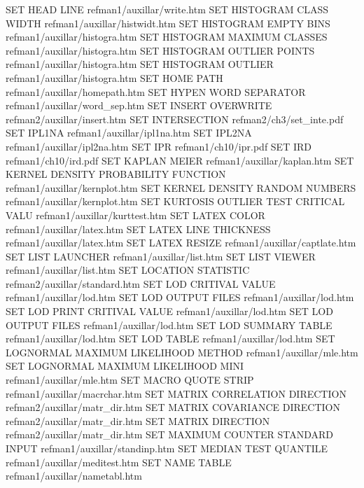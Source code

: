 SET HEAD LINE                           refman1/auxillar/write.htm
SET HISTOGRAM CLASS WIDTH               refman1/auxillar/histwidt.htm
SET HISTOGRAM EMPTY BINS                refman1/auxillar/histogra.htm
SET HISTOGRAM MAXIMUM CLASSES           refman1/auxillar/histogra.htm
SET HISTOGRAM OUTLIER POINTS            refman1/auxillar/histogra.htm
SET HISTOGRAM OUTLIER                   refman1/auxillar/histogra.htm
SET HOME PATH                           refman1/auxillar/homepath.htm
SET HYPEN WORD SEPARATOR                refman1/auxillar/word_sep.htm
SET INSERT OVERWRITE                    refman2/auxillar/insert.htm
SET INTERSECTION                        refman2/ch3/set_inte.pdf
SET IPL1NA                              refman1/auxillar/ipl1na.htm
SET IPL2NA                              refman1/auxillar/ipl2na.htm
SET IPR                                 refman1/ch10/ipr.pdf
SET IRD                                 refman1/ch10/ird.pdf
SET KAPLAN MEIER                        refman1/auxillar/kaplan.htm
SET KERNEL DENSITY PROBABILITY FUNCTION refman1/auxillar/kernplot.htm
SET KERNEL DENSITY RANDOM NUMBERS       refman1/auxillar/kernplot.htm
SET KURTOSIS OUTLIER TEST CRITICAL VALU refman1/auxillar/kurttest.htm
SET LATEX COLOR                         refman1/auxillar/latex.htm
SET LATEX LINE THICKNESS                refman1/auxillar/latex.htm
SET LATEX RESIZE                        refman1/auxillar/captlate.htm
SET LIST LAUNCHER                       refman1/auxillar/list.htm
SET LIST VIEWER                         refman1/auxillar/list.htm
SET LOCATION STATISTIC                  refman2/auxillar/standard.htm
SET LOD CRITIVAL VALUE                  refman1/auxillar/lod.htm
SET LOD OUTPUT FILES                    refman1/auxillar/lod.htm
SET LOD PRINT CRITIVAL VALUE            refman1/auxillar/lod.htm
SET LOD OUTPUT FILES                    refman1/auxillar/lod.htm
SET LOD SUMMARY TABLE                   refman1/auxillar/lod.htm
SET LOD TABLE                           refman1/auxillar/lod.htm
SET LOGNORMAL MAXIMUM LIKELIHOOD METHOD refman1/auxillar/mle.htm
SET LOGNORMAL MAXIMUM LIKELIHOOD MINI   refman1/auxillar/mle.htm
SET MACRO QUOTE STRIP                   refman1/auxillar/macrchar.htm
SET MATRIX CORRELATION DIRECTION        refman2/auxillar/matr_dir.htm
SET MATRIX COVARIANCE DIRECTION         refman2/auxillar/matr_dir.htm
SET MATRIX DIRECTION                    refman2/auxillar/matr_dir.htm
SET MAXIMUM COUNTER STANDARD INPUT      refman1/auxillar/standinp.htm
SET MEDIAN TEST QUANTILE                refman1/auxillar/meditest.htm
SET NAME TABLE                          refman1/auxillar/nametabl.htm
